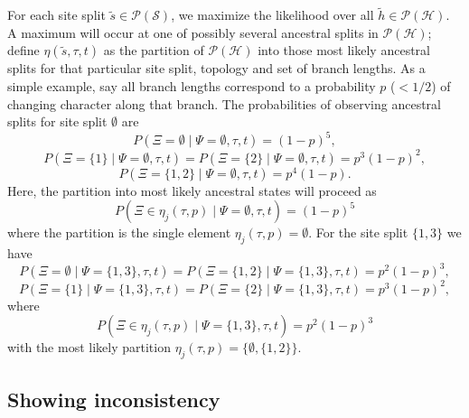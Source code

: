 \documentclass[a4paper]{article}
\newcommand{\siteSplit}{\tilde{s}}
\newcommand{\siteSplitSet}{\mathcal{S}}
\newcommand{\ancestralSplit}{\tilde{h}}
\newcommand{\ancestralSplitSet}{\mathcal{H}}
\newcommand{\ancestralSplitPartition}{\eta}
\newcommand{\siteSplitRV}{\Psi}
\newcommand{\ancestralSplitRV}{\Xi}
\begin{document}
For each site split $\siteSplit\in\mathcal{P}(\siteSplitSet)$, we maximize the likelihood over all $\ancestralSplit\in\mathcal{P}(\ancestralSplitSet)$.
A maximum will occur at one of possibly several ancestral splits in $\mathcal{P}(\ancestralSplitSet)$; define $\ancestralSplitPartition(\siteSplit, \tau, t)$ as the partition of $\mathcal{P}(\ancestralSplitSet)$ into those most likely ancestral splits for that particular site split, topology and set of branch lengths.
As a simple example, say all branch lengths correspond to a probability $p$ ($< 1/2$) of changing character along that branch.
The probabilities of observing ancestral splits for site split $\emptyset$ are
$$
P(\ancestralSplitRV=\emptyset \mid \siteSplitRV=\emptyset, \tau, t) =
(1-p)^5,
$$
$$
P(\ancestralSplitRV=\{1\} \mid \siteSplitRV=\emptyset, \tau, t) =
P(\ancestralSplitRV=\{2\} \mid \siteSplitRV=\emptyset, \tau, t) =
p^3(1-p)^2,
$$
$$
P(\ancestralSplitRV=\{1,2\} \mid \siteSplitRV=\emptyset, \tau, t) =
p^4(1-p).
$$
Here, the partition into most likely ancestral states will proceed as
$$
P(\ancestralSplitRV\in\ancestralSplitPartition_j(\tau, p) \mid \siteSplitRV=\emptyset, \tau, t) =
(1-p)^5
$$
where the partition is the single element $\ancestralSplitPartition_j(\tau, p)=\emptyset$.
For the site split $\{1,3\}$ we have
$$
P(\ancestralSplitRV=\emptyset \mid \siteSplitRV=\{1,3\}, \tau, t) =
P(\ancestralSplitRV=\{1,2\} \mid \siteSplitRV=\{1,3\}, \tau, t) =
p^2(1-p)^3,
$$
$$
P(\ancestralSplitRV=\{1\} \mid \siteSplitRV=\{1,3\}, \tau, t) =
P(\ancestralSplitRV=\{2\} \mid \siteSplitRV=\{1,3\}, \tau, t) =
p^3(1-p)^2,
$$
where
$$
P(\ancestralSplitRV\in\ancestralSplitPartition_j(\tau, p) \mid \siteSplitRV=\{1,3\}, \tau, t) =
p^2(1-p)^3
$$
with the most likely partition $\ancestralSplitPartition_j(\tau, p)=\{\emptyset,\{1,2\}\}.$


\subsection{Showing inconsistency}
\end{document}
